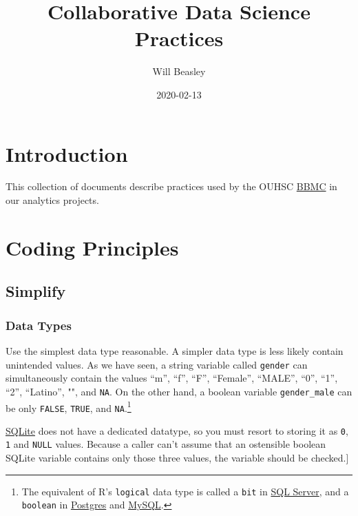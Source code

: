 \documentclass[
]{book}
\title{Collaborative Data Science Practices}
\author{Will Beasley}
\date{2020-02-13}
\begin{document}
\maketitle

{
\setcounter{tocdepth}{1}
\tableofcontents
}
\hypertarget{intro}{%
\chapter{Introduction}\label{intro}}

This collection of documents describe practices used by the OUHSC \href{https://ouhsc.edu/bbmc}{BBMC} in our analytics projects.

\hypertarget{coding}{%
\chapter{Coding Principles}\label{coding}}

\hypertarget{coding-simplify}{%
\section{Simplify}\label{coding-simplify}}

\hypertarget{coding-simplify-types}{%
\subsection{Data Types}\label{coding-simplify-types}}

Use the simplest data type reasonable. A simpler data type is less likely contain unintended values. As we have seen, a string variable called \texttt{gender} can simultaneously contain the values ``m'', ``f'', ``F'', ``Female'', ``MALE'', ``0'', ``1'', ``2'', ``Latino'', "", and \texttt{NA}. On the other hand, a boolean variable \texttt{gender\_male} can be only \texttt{FALSE}, \texttt{TRUE}, and \texttt{NA}.\footnote{The equivalent of R's \texttt{logical} data type is called a \texttt{bit} in \href{https://docs.microsoft.com/en-us/sql/t-sql/data-types/bit-transact-sql}{SQL Server}, and a \texttt{boolean} in \href{https://www.postgresql.org/docs/current/datatype-boolean.html}{Postgres} and \href{https://dev.mysql.com/doc/refman/8.0/en/boolean-literals.html}{MySQL}.}

\href{https://www.sqlite.org/datatype3.html}{SQLite} does not have a dedicated datatype, so you must resort to storing it as \texttt{0}, \texttt{1} and \texttt{NULL} values. Because a caller can't assume that an ostensible boolean SQLite variable contains only those three values, the variable should be checked.{]}
\end{document}
